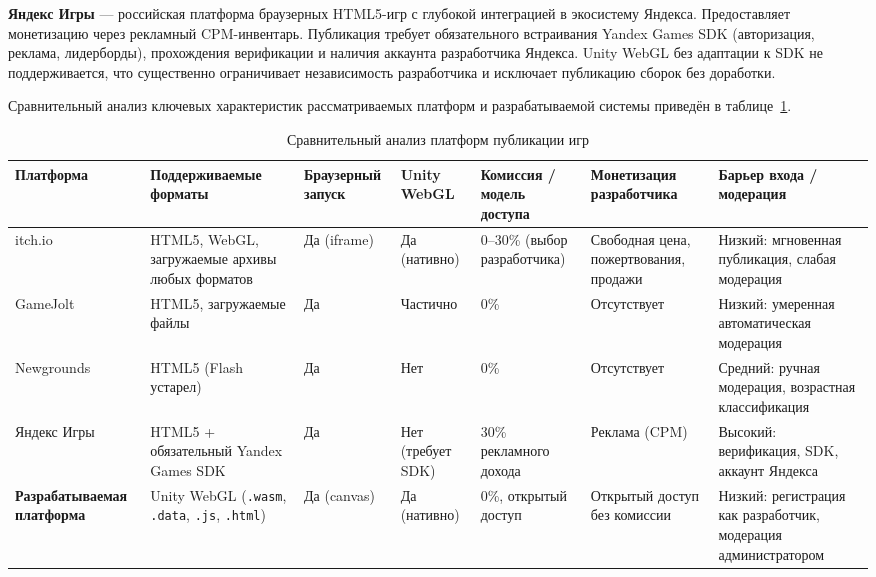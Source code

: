 \textbf{Яндекс Игры} --- российская платформа браузерных HTML5-игр с глубокой
интеграцией в экосистему Яндекса. Предоставляет монетизацию через рекламный
CPM-инвентарь. Публикация требует обязательного встраивания Yandex Games SDK
(авторизация, реклама, лидерборды), прохождения верификации и наличия аккаунта
разработчика Яндекса. Unity WebGL без адаптации к SDK не поддерживается, что
существенно ограничивает независимость разработчика и исключает публикацию сборок без
доработки.

Сравнительный анализ ключевых характеристик рассматриваемых платформ и разрабатываемой
системы приведён в таблице~\ref{tab:competitors}.

\begin{landscape}
\begin{table}[p]
    \centering
    \caption{Сравнительный анализ платформ публикации игр}
    \label{tab:competitors}
    \small
    \begin{tabularx}{23cm}{|p{2.9cm}|X|p{2cm}|p{2cm}|p{2.8cm}|X|p{2.8cm}|}
        \hline
        \textbf{Платформа} &
        \textbf{Поддерживаемые форматы} &
        \textbf{Браузерный запуск} &
        \textbf{Unity WebGL} &
        \textbf{Комиссия / модель доступа} &
        \textbf{Монетизация разработчика} &
        \textbf{Барьер входа / модерация} \\ \hline
        itch.io &
        HTML5, WebGL, загружаемые архивы любых форматов &
        Да (iframe) &
        Да (нативно) &
        0--30\% (выбор разработчика) &
        Свободная цена, пожертвования, продажи &
        Низкий: мгновенная публикация, слабая модерация \\ \hline
        GameJolt &
        HTML5, загружаемые файлы &
        Да &
        Частично &
        0\% &
        Отсутствует &
        Низкий: умеренная автоматическая модерация \\ \hline
        Newgrounds &
        HTML5 (Flash устарел) &
        Да &
        Нет &
        0\% &
        Отсутствует &
        Средний: ручная модерация, возрастная классификация \\ \hline
        Яндекс Игры &
        HTML5 + обязательный Yandex Games SDK &
        Да &
        Нет (требует SDK) &
        30\% рекламного дохода &
        Реклама (CPM) &
        Высокий: верификация, SDK, аккаунт Яндекса \\ \hline
        \textbf{Разрабатываемая платформа} &
        Unity WebGL (\texttt{.wasm}, \texttt{.data}, \texttt{.js}, \texttt{.html}) &
        Да (canvas) &
        Да (нативно) &
        0\%, открытый доступ &
        Открытый доступ без комиссии &
        Низкий: регистрация как разработчик, модерация администратором \\ \hline
    \end{tabularx}
\end{table}
\end{landscape}


